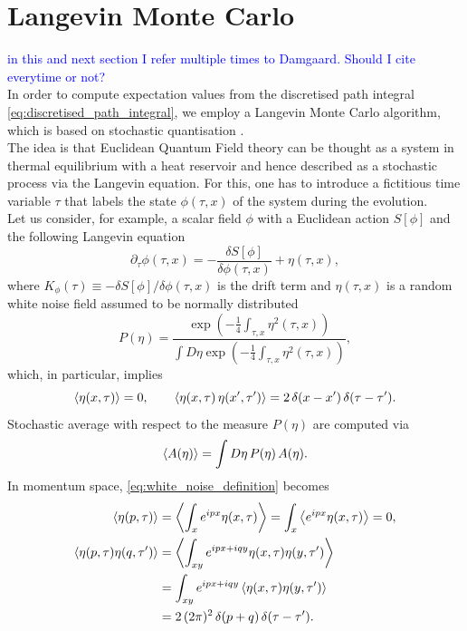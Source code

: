 \section{Langevin Monte Carlo}
\textcolor{blue}{in this and next section I refer multiple times to Damgaard. Should I cite everytime or not?}\\ 
In order to compute expectation values from the discretised path integral \eqref{eq:discretised_path_integral}, we employ a Langevin Monte Carlo algorithm, which is based on stochastic quantisation \cite{ParisiWu, Damgaard1987StochasticQuantization}. \\
The idea is that Euclidean Quantum Field theory can be thought as a system in thermal equilibrium with a heat reservoir and hence described as a stochastic process via the Langevin equation. For this, one has to introduce a fictitious time variable $\tau$ that labels the state $\phi(\tau, x)$ of the system 
during the evolution. \\
Let us consider, for example, a scalar field $\phi$ with a Euclidean action $S[\phi]$ and the following Langevin equation
\begin{equation}
    \partial_\tau \phi(\tau, x) = - \frac{\delta S[\phi]}{\delta \phi (\tau, x)} + \eta (\tau, x),
    \label{eq:Langevin_scalar_full}
\end{equation}
where $K_{\phi}(\tau) \equiv -\delta S[\phi]/\delta \phi (\tau, x)$ is the drift term and $\eta (\tau, x)$ is a random white noise field assumed to be normally distributed
\begin{equation*}
    P(\eta) = \frac{\exp\left(-\frac{1}{4}\int_{\tau,x} \eta^2(\tau, x)\right)}{\int D\eta \exp\left(-\frac{1}{4}\int_{\tau,x} \eta^2(\tau,x)\right)},
\end{equation*} 
which, in particular, implies
\begin{equation}
    \left\langle \eta(x,\tau) \right\rangle = 0, \qquad \left\langle \eta(x,\tau) \, \eta(x',\tau') \right\rangle = 2 \, \delta(x - x') \, \delta (\tau - \tau').
    \label{eq:white_noise_definition}
\end{equation}
Stochastic average with respect to the measure $P(\eta)$ are computed via 
\begin{equation*}
    \left\langle A(\eta) \right\rangle = \int D\eta \, P(\eta) \, A(\eta).
\end{equation*}
In momentum space, \eqref{eq:white_noise_definition} becomes
\begin{equation}
    \begin{aligned}
        \left\langle \eta(p,\tau) \right\rangle &= \left\langle \int_x e^{ipx}\eta(x,\tau) \right\rangle = \int_x \left\langle e^{ipx}\eta(x,\tau) \right\rangle = 0, \\
        \left\langle \eta(p,\tau)\eta(q,\tau') \right\rangle &= \left\langle \int_{xy} e^{ipx + iqy} \eta(x,\tau)\eta(y,\tau') \right\rangle \\
        &= \int_{xy} e^{ipx + iqy} \left\langle \eta(x,\tau)\eta(y,\tau') \right\rangle \\
        &= 2 \, (2\pi)^2 \, \delta(p + q) \, \delta(\tau - \tau').
    \end{aligned}
    \label{eq:white_noise_definition_momentum}
\end{equation}

